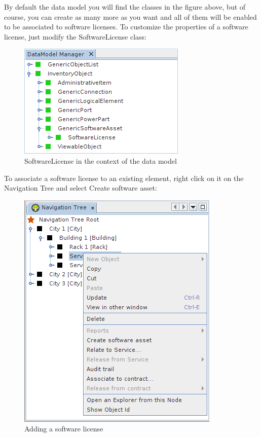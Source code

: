 \documentclass[a4paper]{article}
\begin{document}
	    By default the data model you  will find the classes in the figure above, but of course, you can create as many more as you want and all of them will be enabled to be associated to software licenses. To customize the properties of a software license, just modify the SoftwareLicense class:
	    \begin{figure}[h!]
	    	\centering
	    	\includegraphics[width=0.5\linewidth]{img/software_asset_data_model_software_asset.png}
	    	\caption{SoftwareLicense in the context of the data model}
	    	\label{fig:software_asset_data_model_software_asset}
	    \end{figure}
	    
	    To associate a software license to an existing element, right click on it on the Navigation Tree and select Create software asset:
		\begin{figure}[h!]
	     	\centering
	     	\includegraphics[width=0.5\linewidth]{img/software_asset_action.png}
	     	\caption{Adding a software license}
	     	\label{fig:software_asset_action}
		\end{figure}
	    
\end{document}
